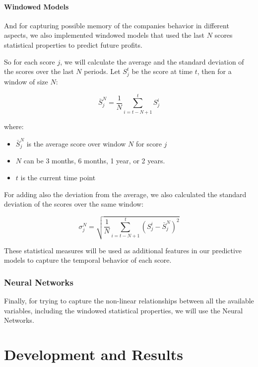 \documentclass[11pt,english,a4paper,hidelinks]{book}
\begin{document}
\subsubsection{Windowed Models}
And for capturing possible memory of the companies behavior in different aspects, we also implemented windowed models that used the last \(N\) scores statistical properties to predict future profits.

\vspace{0.5cm}
\noindent So for each score \(j\), we will calculate the average and the standard deviation of the scores over the last \(N\) periods. Let \(S_j^t\) be the score at time \(t\), then for a window of size \(N\):

\begin{equation}
    \bar{S}_j^N = \frac{1}{N} \sum_{i=t-N+1}^{t} S_j^i
\end{equation}

\noindent where:
\begin{itemize}
    \item \(\bar{S}_j^N\) is the average score over window \(N\) for score \(j\)
    \item \(N\) can be 3 months, 6 months, 1 year, or 2 years.
    \item \(t\) is the current time point
\end{itemize}

\noindent For adding also the deviation from the average, we also calculated the standard deviation of the scores over the same window:

\begin{equation}
    \sigma_j^N = \sqrt{\frac{1}{N} \sum_{i=t-N+1}^{t} (S_j^i - \bar{S}_j^N)^2}
\end{equation}

\noindent These statistical measures will be used as additional features in our predictive models to capture the temporal behavior of each score.

\subsection{Neural Networks}

Finally, for trying to capture the non-linear relationships between all the available variables, including the windowed statistical properties, we will use the Neural Networks.



\chapter{Development and Results}
\end{document}
